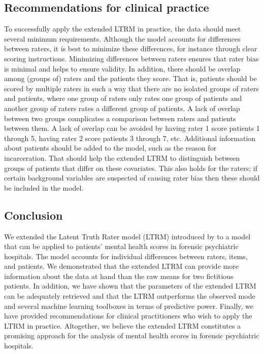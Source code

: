 \documentclass[a4paper,usenames,dvipsnames]{article}
\newcommand{\DON}	[1] 	{}%
\newcommand{\MR}	[1] 	{}%
\newenvironment{revision}{\color{teal}}{\color{black}}
\begin{document}
\subsection*{Recommendations for clinical practice}
To successfully apply the extended LTRM in practice, the data should meet several minimum requirements. Although the model accounts for differences between raters, it is best to minimize these differences, for instance through clear scoring instructions.\MR{why?}\DON{see 2nd sentence} Minimizing differences between raters ensures that rater bias is minimal and helps to ensure validity. In addition, there should be overlap among (groups of) raters and the patients they score. That is, patients should be scored by multiple raters in such a way that there are no isolated groups of raters and patients, where one group of raters only rates one group of patients and another group of raters rates a different group of patients. A lack of overlap between two groups complicates a comparison between raters and patients between them. A lack of overlap can be avoided by having rater 1 score patients 1 through 5, having rater 2 score patients 3 through 7, etc. Additional information about patients should be added to the model, such as the reason for incarceration. That should help the extended LTRM to distinguish between groups of patients that differ on these covariates. This also holds for the raters; if certain background variables are suspected of causing rater bias then these should be included in the model.\MR{ok, I get this part. I'm still very unclear on what the patient background info adds if the goal is to produce factor scores, and not to estimate the effect of patient characteristics on those scores, what is added by including them?}

\subsection*{Conclusion}
We extended the Latent Truth Rater model (LTRM) introduced by  to a model that can be applied to patients' mental health scores in forensic psychiatric hospitals. The model accounts for individual differences between raters, items, and patients. We demonstrated that the extended LTRM can provide more information about the data at hand than the raw means for two fictitious patients. In addition, we have shown that the parameters of the extended LTRM can be adequately retrieved and that the LTRM outperforms the observed mode and several machine learning toolboxes in terms of predictive power. Finally, we have provided recommendations for clinical practitioners who wish to apply the LTRM in practice. \begin{revision}Altogether, we believe the extended LTRM constitutes a promising approach for the analysis of mental health scores in forensic psychiatric hospitals.\end{revision} 
\end{document}
